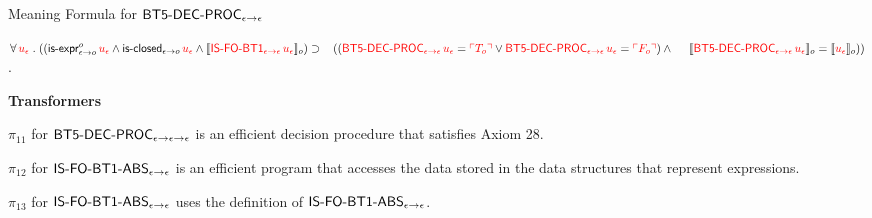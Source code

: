 \begin{biformthy}
    \item Meaning Formula for $\mbox{\sf BT5-DEC-PROC}_{\epsilon \rightarrow \epsilon}$

    $\forall\, \textcolor{red}{u_\epsilon} \mathrel. 
     ((\mbox{\sf is-expr}_{\epsilon \rightarrow o}^{o} \, 
     \textcolor{red}{u_\epsilon} \wedge
     \mbox{\sf is-closed}_{\epsilon \rightarrow o} \, \textcolor{red}{u_\epsilon} \wedge 
     \llbracket\textcolor{red}{\mbox{\sf IS-FO-BT1}_{\epsilon \rightarrow \epsilon} \, 
     u_\epsilon}\rrbracket_o) \supset {}\\
     \hspace*{2ex}((\textcolor{red}{\mbox{\sf BT5-DEC-PROC}_{\epsilon \rightarrow \epsilon} \, u_\epsilon} = 
     \textcolor{red}{\ulcorner T_o\urcorner} \vee 
     \textcolor{red}{\mbox{\sf BT5-DEC-PROC}_{\epsilon \rightarrow \epsilon} \, u_\epsilon} = 
     \textcolor{red}{\ulcorner F_o\urcorner}) \wedge {}\\
     \hspace*{3.1ex}
     \llbracket\textcolor{red}{\mbox{\sf BT5-DEC-PROC}_{\epsilon \rightarrow \epsilon} \, u_\epsilon}\rrbracket_o =
     \llbracket\textcolor{red}{u_\epsilon}\rrbracket_o))$.

  \ee

  \item[] \textbf{Transformers}

  \be

    \setcounter{enumi}{10}

    \item $\pi_{11}$ for $\mbox{\sf BT5-DEC-PROC}_{\epsilon \rightarrow
      \epsilon \rightarrow \epsilon}$ is an efficient decision procedure
      that satisfies Axiom 28.


    \item $\pi_{12}$ for $\mbox{\sf IS-FO-BT1-ABS}_{\epsilon \rightarrow
      \epsilon}$ is an efficient program that accesses the data stored
      in the data structures that represent expressions.

    \item $\pi_{13}$ for $\mbox{\sf IS-FO-BT1-ABS}_{\epsilon \rightarrow
      \epsilon}$ uses the definition of
      $\mbox{\sf IS-FO-BT1-ABS}_{\epsilon \rightarrow \epsilon}$.

  \ee

\ei
\end{biformthy}

